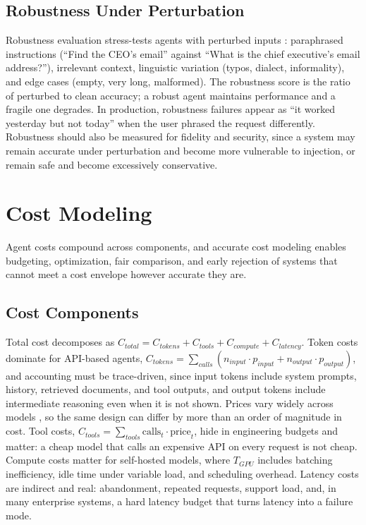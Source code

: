 \documentclass[11pt]{book}
\begin{document}
\subsection{Robustness Under Perturbation}

Robustness evaluation stress-tests agents with perturbed inputs \cite{agentevalsurvey2025}: paraphrased instructions (``Find the CEO's email'' against ``What is the chief executive's email address?''), irrelevant context, linguistic variation (typos, dialect, informality), and edge cases (empty, very long, malformed). The robustness score is the ratio of perturbed to clean accuracy; a robust agent maintains performance and a fragile one degrades. In production, robustness failures appear as ``it worked yesterday but not today'' when the user phrased the request differently. Robustness should also be measured for fidelity and security, since a system may remain accurate under perturbation and become more vulnerable to injection, or remain safe and become excessively conservative.

\section{Cost Modeling}

Agent costs compound across components, and accurate cost modeling enables budgeting, optimization, fair comparison, and early rejection of systems that cannot meet a cost envelope however accurate they are.

\subsection{Cost Components}

Total cost decomposes as $C_{total} = C_{tokens} + C_{tools} + C_{compute} + C_{latency}$. Token costs dominate for API-based agents, $C_{tokens} = \sum_{calls} (n_{input} \cdot p_{input} + n_{output} \cdot p_{output})$, and accounting must be trace-driven, since input tokens include system prompts, history, retrieved documents, and tool outputs, and output tokens include intermediate reasoning even when it is not shown. Prices vary widely across models \cite{llmpricing2025}, so the same design can differ by more than an order of magnitude in cost. Tool costs, $C_{tools} = \sum_{tools} \text{calls}_t \cdot \text{price}_t$, hide in engineering budgets and matter: a cheap model that calls an expensive API on every request is not cheap. Compute costs matter for self-hosted models, where $T_{GPU}$ includes batching inefficiency, idle time under variable load, and scheduling overhead. Latency costs are indirect and real: abandonment, repeated requests, support load, and, in many enterprise systems, a hard latency budget that turns latency into a failure mode.
\end{document}
